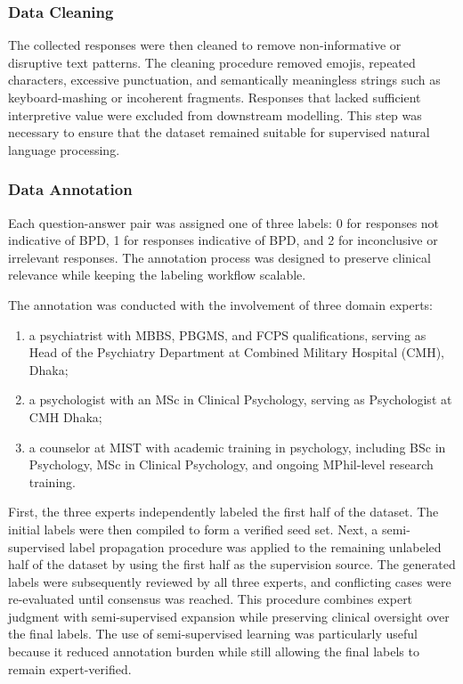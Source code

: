 \documentclass{article}
\begin{document}
\subsubsection{Data Cleaning}
The collected responses were then cleaned to remove non-informative or disruptive text patterns. The cleaning procedure removed emojis, repeated characters, excessive punctuation, and semantically meaningless strings such as keyboard-mashing or incoherent fragments. Responses that lacked sufficient interpretive value were excluded from downstream modelling. This step was necessary to ensure that the dataset remained suitable for supervised natural language processing.

\subsubsection{Data Annotation}
Each question-answer pair was assigned one of three labels: 0 for responses not indicative of BPD, 1 for responses indicative of BPD, and 2 for inconclusive or irrelevant responses. The annotation process was designed to preserve clinical relevance while keeping the labeling workflow scalable.

The annotation was conducted with the involvement of three domain experts:
\begin{enumerate}
    \item a psychiatrist with MBBS, PBGMS, and FCPS qualifications, serving as Head of the Psychiatry Department at Combined Military Hospital (CMH), Dhaka;
    \item a psychologist with an MSc in Clinical Psychology, serving as Psychologist at CMH Dhaka;
    \item a counselor at MIST with academic training in psychology, including BSc in Psychology, MSc in Clinical Psychology, and ongoing MPhil-level research training.
\end{enumerate}

First, the three experts independently labeled the first half of the dataset. The initial labels were then compiled to form a verified seed set. Next, a semi-supervised label propagation procedure was applied to the remaining unlabeled half of the dataset by using the first half as the supervision source. The generated labels were subsequently reviewed by all three experts, and conflicting cases were re-evaluated until consensus was reached. This procedure combines expert judgment with semi-supervised expansion while preserving clinical oversight over the final labels. The use of semi-supervised learning was particularly useful because it reduced annotation burden while still allowing the final labels to remain expert-verified.
\end{document}
